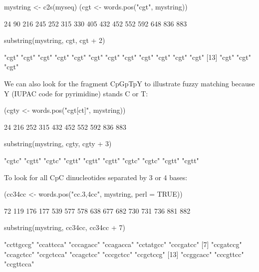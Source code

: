 \documentclass{article}
\begin{document}
\begin{Schunk}
\begin{Sinput}
 mystring <- c2s(myseq)
 (cgt <- words.pos("cgt", mystring))
\end{Sinput}
\begin{Soutput}
 [1]  24  90 216 245 252 315 330 405 432 452 552 592 648 836 883
\end{Soutput}
\begin{Sinput}
 substring(mystring, cgt, cgt + 2)
\end{Sinput}
\begin{Soutput}
 [1] "cgt" "cgt" "cgt" "cgt" "cgt" "cgt" "cgt" "cgt" "cgt" "cgt" "cgt" "cgt"
[13] "cgt" "cgt" "cgt"
\end{Soutput}
\end{Schunk}

We can also look for the fragment CpGpTpY to illustrate fuzzy matching because
Y (IUPAC code for pyrimidine) stands C or T:

\begin{Schunk}
\begin{Sinput}
 (cgty <- words.pos("cgt[ct]", mystring))
\end{Sinput}
\begin{Soutput}
 [1]  24 216 252 315 432 452 552 592 836 883
\end{Soutput}
\begin{Sinput}
 substring(mystring, cgty, cgty + 3)
\end{Sinput}
\begin{Soutput}
 [1] "cgtc" "cgtt" "cgtc" "cgtt" "cgtt" "cgtt" "cgtc" "cgtc" "cgtt" "cgtt"
\end{Soutput}
\end{Schunk}

To look for all CpC dinucleotides separated by 3 or 4 bases:
\begin{Schunk}
\begin{Sinput}
 (cc34cc <- words.pos("cc.{3,4}cc", mystring, perl = TRUE))
\end{Sinput}
\begin{Soutput}
 [1]  72 119 176 177 539 577 578 638 677 682 730 731 736 881 882
\end{Soutput}
\begin{Sinput}
 substring(mystring, cc34cc, cc34cc + 7)
\end{Sinput}
\begin{Soutput}
 [1] "ccttgccg" "ccattcca" "cccagacc" "ccagacca" "cctatgcc" "cccgatcc"
 [7] "ccgatccg" "ccagctcc" "ccgctcca" "ccagctcc" "cccgctcc" "ccgctccg"
[13] "ccggcacc" "cccgttcc" "ccgttcca"
\end{Soutput}
\end{Schunk}
\end{document}
